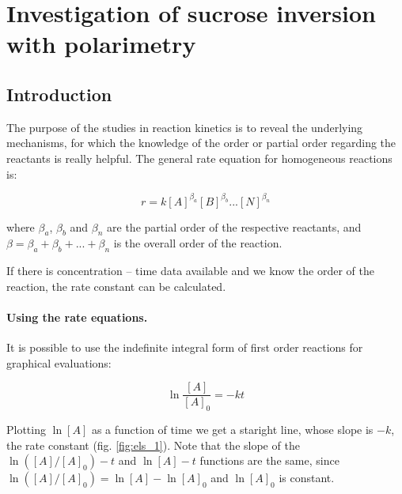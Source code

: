 \fancyhead[LO,RE]{\thesection}
\fancyfoot[LE,RO]{\thepage}

\section{Investigation of sucrose inversion with polarimetry}
\subsection{Introduction}
The purpose of the studies in reaction kinetics is to reveal the underlying mechanisms, for which the knowledge of the order or partial order regarding the reactants is really helpful.
The general rate equation for homogeneous reactions is:

\begin{equation}
\label{eq:general}
	r
	=
	k[A]^{\beta_a}[B]^{\beta_b}...[N]^{\beta_n}
\end{equation}

where $\beta_a$, $\beta_b$ and $\beta_n$ are the partial order of the respective reactants, and $\beta = \beta_a + \beta_b + ... + \beta_n$ is the overall order of the reaction.

If there is concentration -- time data available and we know the order of the reaction, the rate constant can be calculated.

\paragraph{Using the rate equations.}
It is possible to use the indefinite integral form of first order reactions for graphical evaluations:

\begin{equation}
\label{eq:2}
	\ln 
	\frac{[A]}{[A]_0}
	=
	- k
	t
\end{equation}

Plotting $\ln [A]$ as a function of time we get a staright line, whose slope is $-k$, the rate constant (fig. \ref{fig:els_1}). Note that the slope of the $\ln ([A]/[A]_0) - t$ and $\ln [A] - t$ functions are the same, since $\ln ([A]/[A]_0) = \ln [A] - \ln [A]_0$ and $\ln [A]_0$ is constant.

